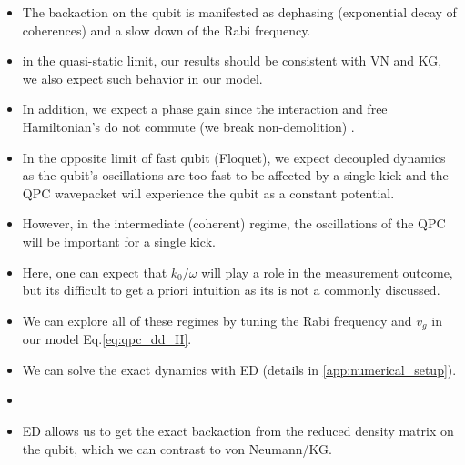 \documentclass[10pt,
 amsmath,amssymb,
 aps,prb, twocolumn
]{revtex4-2}
\begin{document}
\begin{itemize}
    \item The backaction on the qubit is manifested as dephasing (exponential decay of coherences) and a slow down of the Rabi frequency.

    \item in the quasi-static limit, our results should be consistent with VN and KG, we also expect such behavior in our model.
    
    \item  In addition, we expect a phase gain since the interaction and free Hamiltonian's do not commute (we break non-demolition) \cite{siddiqi2024}.

    \item In the opposite limit of fast qubit (Floquet), we expect decoupled dynamics as the qubit's oscillations are too fast to be affected by a single kick and the QPC wavepacket will experience the qubit as a constant potential.
    
    \item However, in the intermediate (coherent) regime, the oscillations of the QPC will be important for a single kick.

    \item Here, one can expect that $k_0 / \omega$ will play a role in the measurement outcome, but its difficult to get a priori intuition as its is not a commonly discussed.

    \item We can explore all of these regimes by tuning the Rabi frequency and $v_g$ in our model Eq.\eqref{eq:qpc_dd_H}.

    \item  We can solve the exact dynamics with ED (details in \ref{app:numerical_setup}).

    \item {}

    \item ED allows us to get the exact backaction from the reduced density matrix on the qubit, which we can contrast to von Neumann/KG. 
    


\end{itemize}
\end{document}
